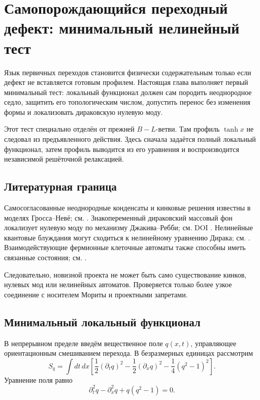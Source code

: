\chapter{Самопорождающийся переходный дефект: минимальный нелинейный тест}

Язык первичных переходов становится физически содержательным только если
дефект не вставляется готовым профилем. Настоящая глава выполняет первый
минимальный тест: локальный функционал должен сам породить неоднородное
седло, защитить его топологическим числом, допустить перенос без изменения
формы и локализовать дираковскую нулевую моду.

Этот тест специально отделён от прежней $B-L$-ветви. Там профиль
$\tanh x$ не следовал из предъявленного действия. Здесь сначала задаётся
полный локальный функционал, затем профиль выводится из его уравнения и
воспроизводится независимой решёточной релаксацией.

\section{Литературная граница}

Самосогласованные неоднородные конденсаты и кинковые решения известны в
моделях Гросса--Невё; см. . Знакопеременный
дираковский массовый фон локализует нулевую моду по механизму
Джакива--Ребби; см. DOI . Нелинейные
квантовые блуждания могут сходиться к нелинейному уравнению Дирака;
см. . Взаимодействующие фермионные клеточные
автоматы также способны иметь связанные состояния; см.
.

Следовательно, новизной проекта не может быть само существование кинков,
нулевых мод или нелинейных автоматов. Проверяется только более узкое
соединение с носителем Мориты и проектными запретами.

\section{Минимальный локальный функционал}

В непрерывном пределе введём вещественное поле $q(x,t)$, управляющее
ориентационным смешиванием перехода. В безразмерных единицах рассмотрим
\begin{equation}
 S_q=\int dt\,dx\left[
 \frac12(\partial_tq)^2-\frac12(\partial_xq)^2
 -\frac14(q^2-1)^2
 \right].
 \label{eq:v5-self-defect-action}
\end{equation}
Уравнение поля равно
\begin{equation}
 \partial_t^2q-\partial_x^2q+q(q^2-1)=0.
 \label{eq:v5-self-defect-eom}
\end{equation}


